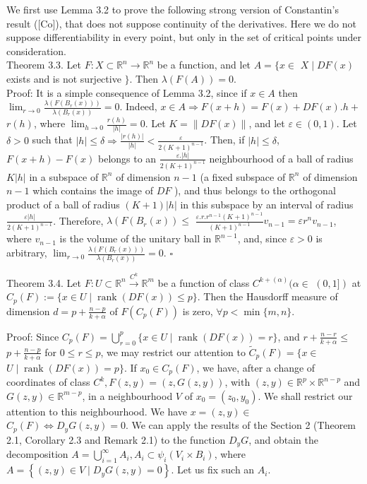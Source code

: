 \documentclass[10pt]{article}
\begin{document}
We first use Lemma 3.2 to prove the following strong version of Constantin's result ([Co]), that does not suppose continuity of the derivatives. Here we do not suppose differentiability in every point, but only in the set of critical points under consideration.\\
Theorem 3.3. Let $F: X \subset \mathbb{R}^{n} \rightarrow \mathbb{R}^{n}$ be a function, and let $A=\{x \in$ $X \mid D F(x)$ exists and is not surjective $\}$. Then $\lambda(F(A))=0$.\\
Proof: It is a simple consequence of Lemma 3.2, since if $x \in A$ then $\lim _{r \rightarrow 0} \frac{\lambda\left(F\left(B_{r}(x)\right)\right)}{\lambda\left(B_{r}(x)\right)}=0$. Indeed, $x \in A \Rightarrow F(x+h)=F(x)+D F(x) . h+$ $r(h)$, where $\lim _{h \rightarrow 0} \frac{r(h)}{|h|}=0$. Let $K=\|D F(x)\|$, and let $\varepsilon \in(0,1)$. Let $\delta>0$ such that $|h| \leq \delta \Rightarrow \frac{|r(h)|}{|h|}<\frac{\varepsilon}{2(K+1)^{n-1}}$. Then, if $|h| \leq \delta$, $F(x+h)-F(x)$ belongs to an $\frac{\varepsilon .|h|}{2(K+1)^{n-1}}$ neighbourhood of a ball of radius $K|h|$ in a subspace of $\mathbb{R}^{n}$ of dimension $n-1$ (a fixed subspace of $\mathbb{R}^{n}$ of dimension $n-1$ which contains the image of $D F$ ), and thus belongs to the orthogonal product of a ball of radius $(K+1)|h|$ in this subspace by an interval of radius $\frac{\varepsilon|h|}{2(K+1)^{n-1}}$. Therefore, $\lambda\left(F\left(B_{r}(x)\right) \leq\right.$ $\frac{\varepsilon . r . r^{n-1}(K+1)^{n-1}}{(K+1)^{n-1}} v_{n-1}=\varepsilon r^{n} v_{n-1}$, where $v_{n-1}$ is the volume of the unitary ball in $\mathbb{R}^{n-1}$, and, since $\varepsilon>0$ is arbitrary, $\lim _{r \rightarrow 0} \frac{\lambda\left(F\left(B_{r}(x)\right)\right)}{\lambda\left(B_{r}(x)\right)}=0$. \(\square\)

Theorem 3.4. Let $F: U \subset \mathbb{R}^{n} \xrightarrow{C^{k}} \mathbb{R}^{m}$ be a function of class $C^{k+(\alpha)}(\alpha \in$ $(0,1])$ at $C_{p}(F):=\{x \in U \mid \operatorname{rank}(D F(x)) \leq p\}$. Then the Hausdorff measure of dimension $d=p+\frac{n-p}{k+\alpha}$ of $F\left(C_{p}(F)\right)$ is zero, $\forall p<\min \{m, n\}$.

Proof: Since $C_{p}(F)=\bigcup_{r=0}^{p}\{x \in U \mid \operatorname{rank}(D F(x))=r\}$, and $r+\frac{n-r}{k+\alpha} \leq$ $p+\frac{n-p}{k+\alpha}$ for $0 \leq r \leq p$, we may restrict our attention to $\widetilde{C}_{p}(F)=\{x \in$ $U \mid \operatorname{rank}(D F(x))=p\}$. If $x_{0} \in C_{p}(F)$, we have, after a change of coordinates of class $C^{k}, F(z, y)=(z, G(z, y))$, with $(z, y) \in \mathbb{R}^{p} \times \mathbb{R}^{n-p}$ and $G(z, y) \in \mathbb{R}^{m-p}$, in a neighbourhood $V$ of $x_{0}=\left(z_{0}, y_{0}\right)$. We shall restrict our attention to this neighbourhood. We have $x=(z, y) \in$ $C_{p}(F) \Leftrightarrow D_{y} G(z, y)=0$. We can apply the results of the Section 2 (Theorem 2.1, Corollary 2.3 and Remark 2.1) to the function $D_{y} G$, and obtain the decomposition $A=\bigcup_{i=1}^{\infty} A_{i}, A_{i} \subset \psi_{i}\left(V_{i} \times B_{i}\right)$, where $A=\left\{(z, y) \in V \mid D_{y} G(z, y)=0\right\}$. Let us fix such an $A_{i}$.
\end{document}
